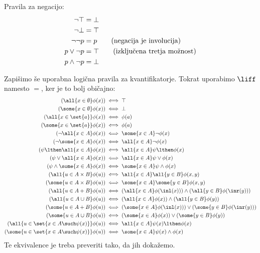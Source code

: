 %
Pravila za negacijo:
%
\begin{align}
  \neg \top  &= \bot \notag \\
  \neg \bot &= \top \notag \\
  \neg\neg p &= p \tag{negacija je involucija} \\
  p \lor \neg p &= \top \tag{izključena tretja možnost} \\
  p \land \neg p &= \bot \notag
\end{align}

Zapišimo še uporabna logična pravila za kvantifikatorje. Tokrat uporabimo $\liff$
namesto $=$, ker je to bolj običajno:
%
\begin{align*}
  (\all{x \in \emptyset} \phi(x))   &\iff   \top \\
  (\some{x \in \emptyset} \phi(x))   &\iff   \bot \\
  (\all{x \in \set{a}} \phi(x))   &\iff   \phi(a) \\
  (\some{x \in \set{a}} \phi(x))   &\iff   \phi(a) \\
  (\neg \all{x \in A} \phi(x))   &\iff   \some{x \in A} \neg \phi(x) \\
  (\neg \some{x \in A} \phi(x))   &\iff   \all{x \in A} \neg \phi(x) \\
  (\psi \lthen \all{x \in A} \phi(x))   &\iff   \all{x \in A} \psi \lthen \phi(x) \\
  (\psi \lor \all{x \in A} \phi(x))   &\iff   \all{x \in A} \psi \lor \phi(x) \\
  (\psi \land \some{x \in A} \phi(x))   &\iff   \some{x \in A} \psi \land \phi(x) \\
  (\all{u \in A \times B} \phi(u))   &\iff   \all{x \in A} \all{y \in B} \phi(x, y) \\
  (\some{u \in A \times B} \phi(u))   &\iff   \some{x \in A} \some{y \in B} \phi(x, y) \\
  (\all{u \in A + B} \phi(u))   &\iff   (\all{x \in A} \phi(\inl(x))) \land (\all{y \in B} \phi(\inr(y))) \\
  (\all{u \in A \cup B} \phi(u))   &\iff   (\all{x \in A} \phi(x)) \land (\all{y \in B} \phi(y)) \\
  (\some{u \in A + B} \phi(u))   &\iff   (\some{x \in A} \phi(\inl(x))) \lor (\some{y \in B} \phi(\inr(y))) \\
  (\some{u \in A \cup B} \phi(u))   &\iff   (\some{x \in A} \phi(x)) \lor (\some{y \in B} \phi(y)) \\
  (\all{u \in \set{x \in A \such \psi(x)}} \phi(u))   &\iff   \all{x \in A} \psi(x) \lthen \phi(x) \\
  (\some{u \in \set{x \in A \such \psi(x)}} \phi(u))   &\iff   \some{x \in A} \psi(x) \land \phi(x)
\end{align*}
%
Te ekvivalence je treba preveriti tako, da jih dokažemo.
